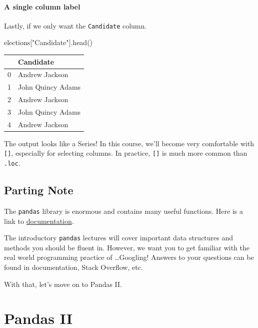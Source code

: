 \documentclass[
  letterpaper,
  DIV=11,
  numbers=noendperiod]{scrreprt}
\newenvironment{Shaded}{\begin{snugshade}}{\end{snugshade}}
\newcommand{\NormalTok}[1]{\textcolor[rgb]{0.00,0.23,0.31}{#1}}
\newcommand{\StringTok}[1]{\textcolor[rgb]{0.13,0.47,0.30}{#1}}
\begin{document}
\hypertarget{a-single-column-label}{%
\subsubsection{A single column label}\label{a-single-column-label}}

Lastly, if we only want the \texttt{Candidate} column.

\begin{Shaded}
\begin{Highlighting}[]
\NormalTok{elections[}\StringTok{"Candidate"}\NormalTok{].head()}
\end{Highlighting}
\end{Shaded}

\begin{tabular}{ll}
\toprule
{} &          Candidate \\
\midrule
0 &     Andrew Jackson \\
1 &  John Quincy Adams \\
2 &     Andrew Jackson \\
3 &  John Quincy Adams \\
4 &     Andrew Jackson \\
\bottomrule
\end{tabular}

The output looks like a Series! In this course, we'll become very
comfortable with \texttt{{[}{]}}, especially for selecting columns. In
practice, \texttt{{[}{]}} is much more common than \texttt{.loc}.

\hypertarget{parting-note}{%
\section{Parting Note}\label{parting-note}}

The \texttt{pandas} library is enormous and contains many useful
functions. Here is a link to
\href{https://pandas.pydata.org/docs/}{documentation}.

The introductory \texttt{pandas} lectures will cover important data
structures and methods you should be fluent in. However, we want you to
get familiar with the real world programming practice of
\ldots Googling! Answers to your questions can be found in
documentation, Stack Overflow, etc.

With that, let's move on to Pandas II.


\hypertarget{pandas-ii}{%
\chapter{Pandas II}\label{pandas-ii}}
\end{document}
